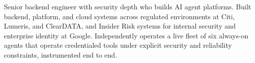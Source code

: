


Senior backend engineer with security depth who builds AI agent platforms. Built backend, platform, and cloud systems across regulated environments at Citi, Lumeris, and ClearDATA, and Insider Risk systems for internal security and enterprise identity at Google. Independently operates a live fleet of six always-on agents that operate credentialed tools under explicit security and reliability constraints, instrumented end to end.








